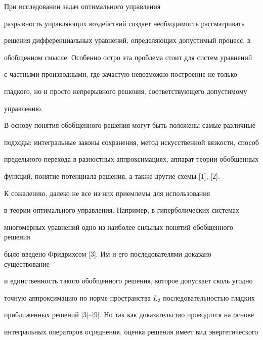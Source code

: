 

\maketitle


\label{begin}








При исследовании задач оптимального управления


разрывность управляющих воздействий создает необходимость рассматривать


решения дифференциальных уравнений, определяющих допустимый процесс, в


обобщенном смысле. Особенно остро эта проблема стоит для систем уравнений 


с частными производными, где зачастую невозможно построение не только 


гладкого, но и просто непрерывного решения, соответствующего допустимому 


управлению.





В основу понятия обобщенного решения могут быть положены самые различные 


подходы: интегральные законы сохранения, метод искусственной вязкости, способ


предельного перехода в разностных аппроксимациях, аппарат теории обобщенных


функций, понятие потенциала решения, а также другие схемы [1], [2].


К сожалению, далеко не все из них приемлемы для использования 


в теории оптимального управления. Например, в гиперболических системах 


многомерных уравнений одно из наиболее сильных понятий обобщенного решения


было введено Фридрихсом [3]. Им и его последователями доказано существование 


и единственность такого обобщенного решения, которое допускает сколь угодно 


точную аппроксимацию по норме пространства $L_2$ последовательностью гладких


приближенных решений [3]--[9]. Но так как доказательство проводится на основе


интегральных операторов осреднения, оценка решения имеет вид энергетического 


